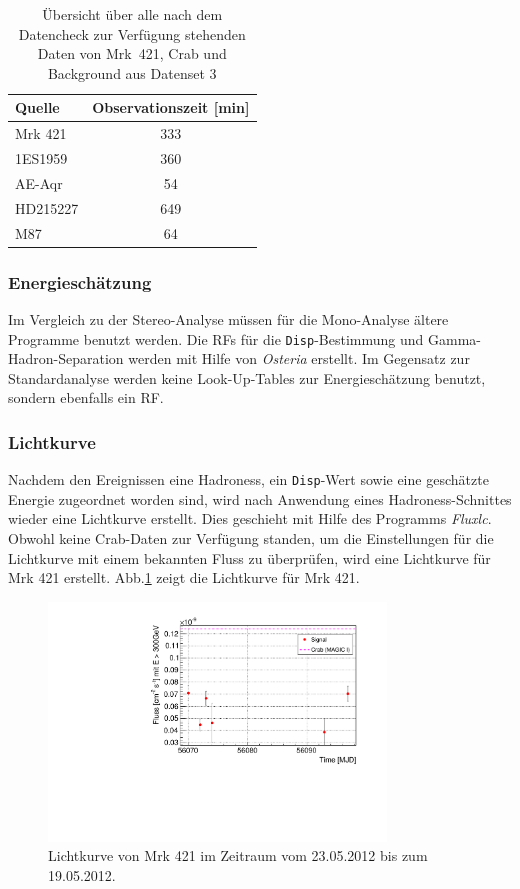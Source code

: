 \begin{table}[!h]
\centering
\caption{Übersicht über alle nach dem Datencheck zur Verfügung stehenden Daten von Mrk~421, Crab und Background aus Datenset 3}
\label{tab:Datenset3}
\begin{tabular}{lc}
  \toprule
  Quelle & Observationszeit [min]\\
  \midrule
  \midrule
  Mrk 421 & 333\\
  \midrule
  1ES1959 & 360 \\
  AE-Aqr & 54  \\
  HD215227 & 649 \\
  M87 & 64 \\
  \bottomrule
  \bottomrule
\end{tabular}
\end{table}

\subsubsection{Energieschätzung}
Im Vergleich zu der Stereo-Analyse müssen für die Mono-Analyse ältere Programme benutzt werden.
Die RFs für die \texttt{Disp}-Bestimmung und Gamma-Hadron-Separation werden mit Hilfe von \textit{Osteria} erstellt.
Im Gegensatz zur Standardanalyse werden keine Look-Up-Tables zur Energieschätzung benutzt, sondern ebenfalls ein RF.

\subsubsection{Lichtkurve}
Nachdem den Ereignissen eine Hadroness, ein \texttt{Disp}-Wert sowie eine geschätzte Energie zugeordnet worden sind, wird nach Anwendung eines Hadroness-Schnittes wieder eine Lichtkurve erstellt.
Dies geschieht mit Hilfe des Programms \textit{Fluxlc}.
Obwohl keine Crab-Daten zur Verfügung standen, um die Einstellungen für die Lichtkurve mit einem bekannten Fluss zu überprüfen, wird eine Lichtkurve für Mrk 421 erstellt.
Abb.\ref{Datenset3_LC_Mrk421} zeigt die Lichtkurve für Mrk 421.

\begin{figure}
    \centering
    \includegraphics[width=0.8\textwidth]{./Plots/04_MrkAnalyse/Datenset3/Datenset3_Mrk421_LC.pdf}
    \caption{Lichtkurve von Mrk 421 im Zeitraum vom 23.05.2012 bis zum 19.05.2012.}
    \label{Datenset3_LC_Mrk421}
\end{figure}


